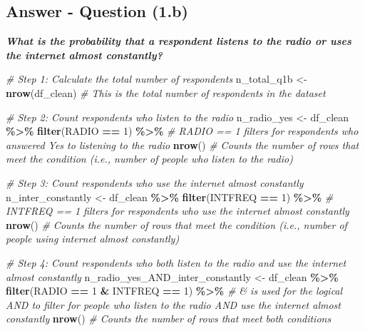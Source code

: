 \documentclass[
  11pt,
]{article}
\newenvironment{Shaded}{\begin{snugshade}}{\end{snugshade}}
\newcommand{\CommentTok}[1]{\textcolor[rgb]{0.56,0.35,0.01}{\textit{#1}}}
\newcommand{\DecValTok}[1]{\textcolor[rgb]{0.00,0.00,0.81}{#1}}
\newcommand{\FunctionTok}[1]{\textcolor[rgb]{0.13,0.29,0.53}{\textbf{#1}}}
\newcommand{\NormalTok}[1]{#1}
\newcommand{\OtherTok}[1]{\textcolor[rgb]{0.56,0.35,0.01}{#1}}
\newcommand{\SpecialCharTok}[1]{\textcolor[rgb]{0.81,0.36,0.00}{\textbf{#1}}}
\begin{document}
\subsection{Answer - Question (1.b)}\label{answer---question-1.b}

\textbf{\emph{What is the probability that a respondent listens to the
radio or uses the internet almost constantly?}}

\begin{Shaded}
\begin{Highlighting}[]
\CommentTok{\# Step 1: Calculate the total number of respondents}
\NormalTok{n\_total\_q1b }\OtherTok{\textless{}{-}} \FunctionTok{nrow}\NormalTok{(df\_clean)  }\CommentTok{\# This is the total number of respondents in the dataset}

\CommentTok{\# Step 2: Count respondents who listen to the radio}
\NormalTok{n\_radio\_yes }\OtherTok{\textless{}{-}}\NormalTok{ df\_clean }\SpecialCharTok{\%\textgreater{}\%}
  \FunctionTok{filter}\NormalTok{(RADIO }\SpecialCharTok{==} \DecValTok{1}\NormalTok{) }\SpecialCharTok{\%\textgreater{}\%}  \CommentTok{\# \textquotesingle{}RADIO == 1\textquotesingle{} filters for respondents who answered \textquotesingle{}Yes\textquotesingle{} to listening to the radio}
  \FunctionTok{nrow}\NormalTok{()  }\CommentTok{\# Counts the number of rows that meet the condition (i.e., number of people who listen to the radio)}

\CommentTok{\# Step 3: Count respondents who use the internet almost constantly}
\NormalTok{n\_inter\_constantly }\OtherTok{\textless{}{-}}\NormalTok{ df\_clean }\SpecialCharTok{\%\textgreater{}\%}
  \FunctionTok{filter}\NormalTok{(INTFREQ }\SpecialCharTok{==} \DecValTok{1}\NormalTok{) }\SpecialCharTok{\%\textgreater{}\%}  \CommentTok{\# \textquotesingle{}INTFREQ == 1\textquotesingle{} filters for respondents who use the internet \textquotesingle{}almost constantly\textquotesingle{}}
  \FunctionTok{nrow}\NormalTok{()  }\CommentTok{\# Counts the number of rows that meet the condition (i.e., number of people using internet almost constantly)}

\CommentTok{\# Step 4: Count respondents who both listen to the radio and use the internet almost constantly}
\NormalTok{n\_radio\_yes\_AND\_inter\_constantly }\OtherTok{\textless{}{-}}\NormalTok{ df\_clean }\SpecialCharTok{\%\textgreater{}\%}
  \FunctionTok{filter}\NormalTok{(RADIO }\SpecialCharTok{==} \DecValTok{1} \SpecialCharTok{\&}\NormalTok{ INTFREQ }\SpecialCharTok{==} \DecValTok{1}\NormalTok{) }\SpecialCharTok{\%\textgreater{}\%}  \CommentTok{\# \textquotesingle{}\&\textquotesingle{} is used for the logical AND to filter for people who listen to the radio AND use the internet almost constantly}
  \FunctionTok{nrow}\NormalTok{()  }\CommentTok{\# Counts the number of rows that meet both conditions}


\end{Highlighting}
\end{Shaded}
\end{document}
